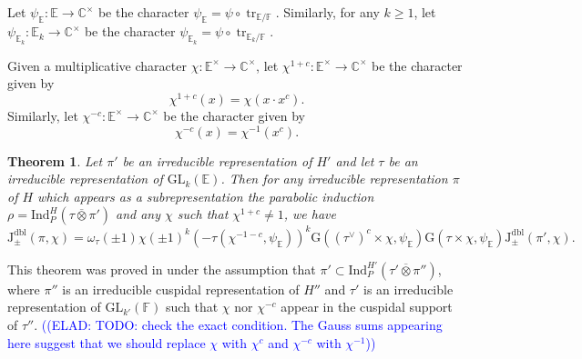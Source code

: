 \documentclass[12pt, reqno]{amsart}
\newtheorem{theorem}{Theorem}[section]
\theoremstyle{definition}
\theoremstyle{definition}
\theoremstyle{definition}
\newcommand{\cComplex}{\mathbb{C}}
\newcommand{\multiplicativegroup}[1]{#1^{\times}}
\newcommand{\fieldCharacter}{\psi}
\newcommand{\centralCharacter}[1]{\omega_{#1}}
\newcommand{\Ind}[3]{\mathrm{Ind}_{#1}^{#2}\left(#3\right)}
\newcommand{\Contragradient}[1]{#1^{\vee}}
\newcommand{\involution}[1]{#1^{c}}
\newcommand{\minusInvolution}[1]{#1^{-c}}
\newcommand{\involutionPlusOne}[1]{#1^{1+c}}
\newcommand{\minusInvolutionMinusOne}[1]{#1^{-1-c}}
\newcommand{\trace}{\operatorname{tr}}
\newcommand{\GL}{\mathrm{GL}}
\newcommand{\finiteField}{\mathbb{F}}
\newcommand{\quadraticExtension}{\mathbb{E}}
\newcommand{\quadraticFieldExtension}[1]{\quadraticExtension_{#1}}
\newcommand{\GaussSumSingleCharacter}[2]{\tau\left(#1, #2\right)}
\newcommand{\GaussSumScalar}[2]{\mathrm{G}\left(#1, #2\right)}
\newcommand{\dblJacobiSumScalar}[2]{\mathrm{J}_{\pm}^{\mathrm{dbl}}\left(#1, #2\right)}
\newcommand{\elad}[1]{\textcolor{blue}{\sffamily ((ELAD: #1))}}
\begin{document}
Let $\fieldCharacter_{\quadraticExtension} \colon \quadraticExtension \to \multiplicativegroup{\cComplex}$ be the character  $\fieldCharacter_{\quadraticExtension} = \fieldCharacter \circ \trace_{\quadraticExtension \slash \finiteField}$. Similarly, for any $k \ge 1$, let $\fieldCharacter_{\quadraticFieldExtension{k}} \colon \quadraticFieldExtension{k} \to \multiplicativegroup{\cComplex}$ be the character $\fieldCharacter_{\quadraticFieldExtension{k}} = \fieldCharacter \circ \trace_{\quadraticFieldExtension{k} \slash \finiteField}$.

Given a multiplicative character $\chi \colon \multiplicativegroup{\quadraticExtension} \to \multiplicativegroup{\cComplex}$, let $\involutionPlusOne{\chi} \colon \multiplicativegroup{\quadraticExtension} \to \multiplicativegroup{\cComplex}$ be the character given by
$$\involutionPlusOne{\chi}\left(x\right) = \chi\left(x \cdot \involution{x}\right).$$ Similarly, let $\minusInvolution{\chi} \colon \multiplicativegroup{\quadraticExtension} \to \multiplicativegroup{\cComplex}$ be the character given by
$$\minusInvolution{\chi}\left(x\right) = \chi^{-1}\left(\involution{x}\right).$$

\begin{theorem}\label{thm:multiplicativity-in-terms-of-gauss-sums}
	Let $\pi'$ be an irreducible representation of $H'$ and let $\tau$ be an irreducible representation of $\GL_k\left(\quadraticExtension\right)$. Then for any irreducible representation $\pi$ of $H$ which appears as a subrepresentation the parabolic induction $\rho = \Ind{P}{H}{\tau \overline{\otimes} \pi'}$ and any $\chi$ such that $\involutionPlusOne{\chi} \ne 1$, we have
	$$\dblJacobiSumScalar{\pi}{\chi} = \centralCharacter{\tau}\left(\pm 1\right) \chi\left(\pm 1\right)^k \left(-\GaussSumSingleCharacter{\minusInvolutionMinusOne{\chi}}{\fieldCharacter_{\quadraticExtension}}\right)^k \GaussSumScalar{\involution{\left(\Contragradient{\tau}\right)} \times \chi}{\fieldCharacter_{\quadraticExtension}} \GaussSumScalar{\tau \times \chi}{\fieldCharacter_{\quadraticExtension}} \dblJacobiSumScalar{\pi'}{\chi}.$$
\end{theorem}

This theorem was proved in \cite{GirschZelingher2025} under the assumption that $\pi' \subset \Ind{P}{H'}{\tau' \overline{\otimes} \pi''}$, where $\pi''$ is an irreducible cuspidal representation of $H''$ and $\tau'$ is an irreducible representation of $\GL_{k'}\left(\finiteField\right)$ such that $\chi$ nor $\minusInvolution{\chi}$ appear in the cuspidal support of $\tau''$. \elad{TODO: check the exact condition. The Gauss sums appearing here suggest that we should replace $\chi$ with $\involution{\chi}$ and $\minusInvolution{\chi}$ with $\chi^{-1}$}
\end{document}
